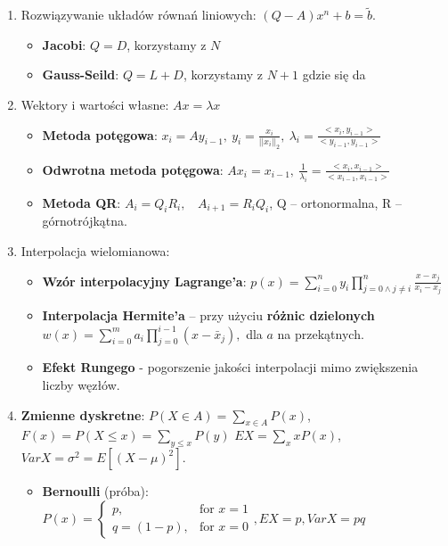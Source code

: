 \documentclass[12pt]{article}
\begin{document}
\begin{enumerate}
        \item Rozwiązywanie układów równań liniowych: $(Q - A)x^n + b = \tilde{b}$.
        \begin{itemize}[noitemsep]
            \item \textbf{Jacobi}: $Q = D$, korzystamy z $N$
            \item \textbf{Gauss-Seild}: $Q = L + D$, korzystamy z $N+1$ gdzie się da
        \end{itemize}

        \item Wektory i wartości własne: $Ax = \lambda x$
        \begin{itemize}[noitemsep]
            \item \textbf{Metoda potęgowa}: $x_i = Ay_{i-1}, ~ y_i = \frac{x_i}{||x_i||_2}, ~
            \lambda_i = \frac{<x_i, y_{i-1}>}{<y_{i-1}, y_{i-1}>}$
            \item \textbf{Odwrotna metoda potęgowa}:  $Ax_i = x_{i-1}, ~ \frac{1}{\lambda_i} = \frac{<x_i, x_{i-1}>}{<x_{i-1}, x_{i-1}>}$
            \item \textbf{Metoda QR}: $A_i = Q_i R_i, ~~~~ A_{i+1} = R_i Q_i$, Q -- ortonormalna, R -- górnotrójkątna.
        \end{itemize}

        \item Interpolacja wielomianowa:
        \begin{itemize}[noitemsep]
            \item \textbf{Wzór interpolacyjny Lagrange'a}:
            $p(x)=\sum _{i=0}^{n}y_{i}\prod _{j=0\land j\neq i}^{n}{\frac {x-x_{j}}{x_{i}-x_{j}}}$
            \item \textbf{Interpolacja Hermite'a} -- przy użyciu \textbf{różnic dzielonych}
            $ w(x)=\sum _{i=0}^{m}a_{i}\prod _{j=0}^{i-1}(x-{\bar {x}}_{j}),$ dla $a$ na przekątnych.
            \item \textbf{Efekt Rungego} - pogorszenie jakości interpolacji mimo zwiększenia liczby węzłów.
        \end{itemize}

        \item \textbf{Zmienne dyskretne}: $P(X \in A) = \sum_{x \in A} P(x)$,  $F(x) = P(X \leq x) = \sum_{y \leq x}P(y)$
        $EX = \sum_{x} x P(x)$, $VarX = \sigma^2 = E[ (X - \mu)^2 ]$.
        \begin{itemize}[noitemsep]
            \item \textbf{Bernoulli} (próba):
            $P(x) = \left\{\begin{array}{lr}
                               p,         & \text{for } x = 1 \\
                               q = (1-p), & \text{for } x = 0
            \end{array}\right., EX = p, VarX = pq$


\end{itemize}
\end{enumerate}
\end{document}
